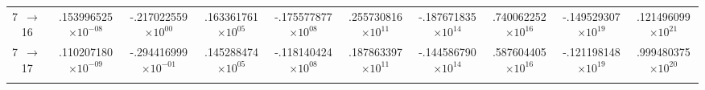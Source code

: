 \documentclass[reviewcopy]{elsarticle}
\begin{document}
\begin{landscape}
\begin{longtable}{lccccccccc}
 7~$\to$~ 16 &  .153996525$\times10^{-08}$ & -.217022559$\times10^{00}$ &  .163361761$\times10^{05}$ & -.175577877$\times10^{08}$ &  .255730816$\times10^{11}$ & -.187671835$\times10^{14}$ &  .740062252$\times10^{16}$ & -.149529307$\times10^{19}$ &  .121496099$\times10^{21}$ \\
 7~$\to$~ 17 &  .110207180$\times10^{-09}$ & -.294416999$\times10^{-01}$ &  .145288474$\times10^{05}$ & -.118140424$\times10^{08}$ &  .187863397$\times10^{11}$ & -.144586790$\times10^{14}$ &  .587604405$\times10^{16}$ & -.121198148$\times10^{19}$ &  .999480375$\times10^{20}$ \\[3pt]
\hline \\
\end{longtable}
\normalsize
\renewcommand{\thefootnote}{\arabic{footnote}}
\renewcommand{\arraystretch}{1.0}
\end{landscape}

\newpage
\end{document}
